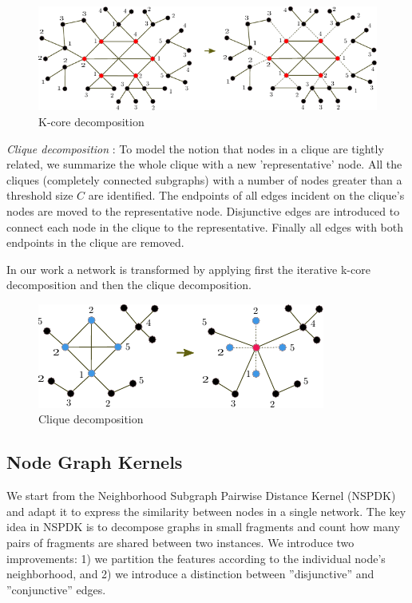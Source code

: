\documentclass[review]{elsarticle}
\begin{document}
\begin{figure}
\centering
\includegraphics[width=.9\textwidth]{k_core}
\caption{K-core decomposition}
\label{fig:example}
\end{figure}

\textit{Clique decomposition} \cite{tarjan1985decomposition}: To model the notion that nodes in a clique are tightly related, we summarize the whole clique with a new 'representative' node. All the cliques (completely connected subgraphs) with a number of nodes greater than a threshold size $C$ are identified. The endpoints of all edges incident on the clique's nodes are moved to the representative node. Disjunctive edges are introduced to connect each node in the clique to the representative. Finally all edges with both endpoints in the clique are removed.

In our work a network is transformed by applying first the iterative k-core decomposition and then the clique decomposition.

\begin{figure}
\centering
\includegraphics[width=.9\textwidth]{clique}
\caption{Clique decomposition}
\label{fig:example}
\end{figure}

\subsection{Node Graph Kernels} 
We start from the Neighborhood Subgraph Pairwise Distance Kernel (NSPDK) \cite{costa2010fast} and adapt it to express the similarity between nodes in a single network. The key idea in NSPDK is to decompose graphs in small fragments and count how many pairs of fragments are shared between two instances. We introduce two improvements: 1) we partition the features according to the individual node's neighborhood, and 2) we introduce a  distinction between ''disjunctive'' and ''conjunctive'' edges.
\end{document}
